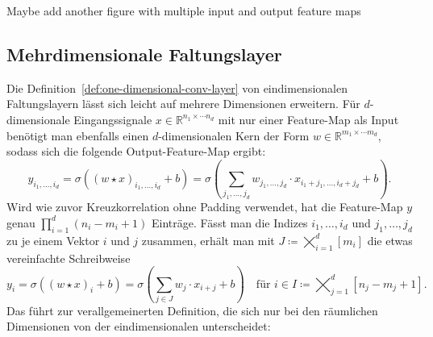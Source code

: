 \documentclass[paper=a4, 	%
		fontsize=11pt, 		%
		abstracton, 	%
		headsepline, 	%
		notitlepage	%
		]{scrartcl}
\theoremstyle{definition}
\newcommand{\R}{\mathbb{R}}
\newcommand{\todo}[1]{{\color{red} #1}}
\begin{document}
\todo{Maybe add another figure with multiple input and output feature maps}

\subsection{Mehrdimensionale Faltungslayer}

Die Definition~\ref{def:one-dimensional-conv-layer} von eindimensionalen Faltungslayern lässt sich leicht auf mehrere Dimensionen erweitern.
Für $d$-dimensionale Eingangssignale $x\in\R^{n_1\times \cdots n_d}$ mit nur einer Feature-Map als Input benötigt man ebenfalls einen $d$-dimensionalen Kern der Form $w\in\R^{m_1\times\cdots m_d}$, sodass sich die folgende Output-Feature-Map ergibt:
\[
    y_{i_1,\dots,i_d} = \sigma\left((w\star x)_{i_1,\dots,i_d} + b\right)
    = \sigma\left( \sum_{j_1,\dots,j_d} w_{j_1,\dots,j_d} \cdot x_{i_1+j_1,\dots,i_d+j_d} + b \right).
\]
Wird wie zuvor Kreuzkorrelation ohne Padding verwendet, hat die Feature-Map $y$ genau $\prod_{i=1}^d (n_i - m_i +1)$ Einträge.
Fässt man die Indizes $i_1,\dots,i_d$ und $j_1,\dots,j_d$ zu je einem Vektor $i$ und $j$ zusammen, erhält man mit $J\coloneqq \bigtimes_{i=1}^d [m_i]$ die etwas vereinfachte Schreibweise
\[
    y_{i} = \sigma\left((w\star x)_{i} + b\right)
    = \sigma\left( \sum_{j \in J} w_j \cdot x_{i+j} + b \right) \quad \text{für $i\in I\coloneqq \bigtimes_{j=1}^d [n_j - m_j +1]$}.
\]
Das führt zur verallgemeinerten Definition, die sich nur bei den räumlichen Dimensionen von der eindimensionalen unterscheidet:
\end{document}
